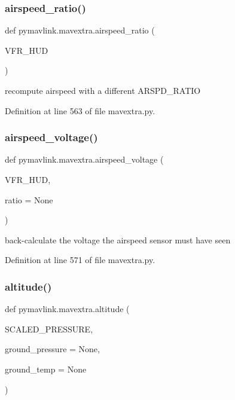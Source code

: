 \subsubsection{\texorpdfstring{airspeed\_ratio()}{airspeed\_ratio()}}
{\footnotesize\ttfamily def pymavlink.\+mavextra.\+airspeed\+\_\+ratio (\begin{DoxyParamCaption}\item[{}]{V\+F\+R\+\_\+\+H\+UD }\end{DoxyParamCaption})}

\begin{DoxyVerb}recompute airspeed with a different ARSPD_RATIO\end{DoxyVerb}
 

Definition at line 563 of file mavextra.\+py.

\mbox{\label{namespacepymavlink_1_1mavextra_a7e374b6fd195ee7b8efbffb17cbf84b7}} 
\subsubsection{\texorpdfstring{airspeed\_voltage()}{airspeed\_voltage()}}
{\footnotesize\ttfamily def pymavlink.\+mavextra.\+airspeed\+\_\+voltage (\begin{DoxyParamCaption}\item[{}]{V\+F\+R\+\_\+\+H\+UD,  }\item[{}]{ratio = {\ttfamily None} }\end{DoxyParamCaption})}

\begin{DoxyVerb}back-calculate the voltage the airspeed sensor must have seen\end{DoxyVerb}
 

Definition at line 571 of file mavextra.\+py.

\mbox{\label{namespacepymavlink_1_1mavextra_abb4bb839562172e4585d794e68856b14}} 
\subsubsection{\texorpdfstring{altitude()}{altitude()}}
{\footnotesize\ttfamily def pymavlink.\+mavextra.\+altitude (\begin{DoxyParamCaption}\item[{}]{S\+C\+A\+L\+E\+D\+\_\+\+P\+R\+E\+S\+S\+U\+RE,  }\item[{}]{ground\+\_\+pressure = {\ttfamily None},  }\item[{}]{ground\+\_\+temp = {\ttfamily None} }\end{DoxyParamCaption})}

